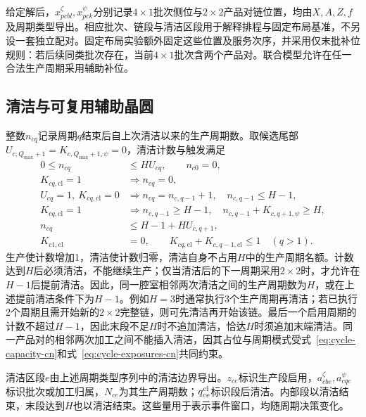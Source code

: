 \documentclass[final,5p,times,twocolumn]{elsarticle}
\begin{document}
给定解后，$x^{\zeta}_{pcbl},x^{\psi}_{pck}$分别记录$4\times1$批次侧位与$2\times2$产品对链位置，均由$X,A,Z,f$及周期类型导出。相应批次、链段与清洁区段用于解释排程与固定布局基准，不另设一套独立配对。固定布局实验额外固定这些位置及服务次序，并采用仅末批补位规则：若后续同类批次存在，当前$4\times1$批次含两个产品对。联合模型允许在任一合法生产周期采用辅助补位。


\subsection{清洁与可复用辅助晶圆}

整数$n_{cq}$记录周期$q$结束后自上次清洁以来的生产周期数。取候选尾部$U_{c,Q_{\max}+1}=K_{c,Q_{\max}+1,\psi}=0$，清洁计数与触发满足
\begin{equation}
\begin{aligned}
0\le n_{cq}&\le H U_{cq},\qquad n_{c0}=0,\\
K_{cq,\mathrm{cl}}=1&\Rightarrow n_{cq}=0,\\
U_{cq}=1,\ K_{cq,\mathrm{cl}}=0
&\Rightarrow n_{cq}=n_{c,q-1}+1,\quad n_{c,q-1}\le H-1,\\
K_{cq,\mathrm{cl}}=1&\Rightarrow n_{c,q-1}\ge H-1,\quad
n_{c,q-1}+K_{c,q+1,\psi}\ge H,\\
n_{cq}&\le H-1+H U_{c,q+1},\\
K_{c1,\mathrm{cl}}&=0,\qquad
K_{cq,\mathrm{cl}}+K_{c,q-1,\mathrm{cl}}\le1\quad(q>1).
\end{aligned}
\label{eq:clean-counter-cn}
\end{equation}
生产使计数增加1，清洁使计数归零，清洁自身不占用$H$中的生产周期名额。计数达到$H$后必须清洁，不能继续生产；仅当清洁后的下一周期采用$2\times2$时，才允许在$H-1$后提前清洁。因此，同一腔室相邻两次清洁之间的生产周期数为$H$，或在上述提前清洁条件下为$H-1$。例如$H=3$时通常执行3个生产周期再清洁；若已执行2个周期且需开始新的$2\times2$完整链，则可先清洁再开始该链。最后一个启用周期的计数不超过$H-1$，因此末段不足$H$时不追加清洁，恰达$H$时须追加末端清洁。同一产品对的相邻两次加工之间不能插入清洁，因其占位与周期模式受式~\eqref{eq:cycle-capacity-cn}和式~\eqref{eq:cycle-exposures-cn}共同约束。

清洁区段$e$由上述周期类型序列中的清洁边界导出。$z_{ce}$标识生产段启用，$a^{\zeta}_{cbe},a^{\psi}_{cqe}$标识批次或加工归属，$N_{ce}$为其生产周期数；$q^{\rm cl}_{ce}$标识段后清洁。内部段以清洁结束，末段达到$H$也以清洁结束。这些量用于表示事件窗口，均随周期决策变化。
\end{document}

